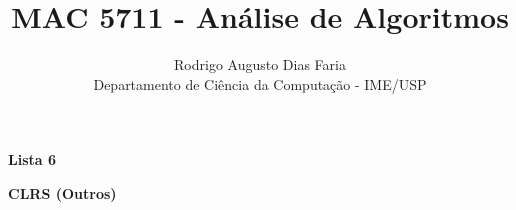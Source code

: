 \documentclass[12pt]{article}
\begin{document}
 
\title{MAC 5711 - Análise de Algoritmos}
\author{Rodrigo Augusto Dias Faria\\
Departamento de Ciência da Computação - IME/USP}
 
\maketitle

\begin{comment}
\begin{center} 
\textbf{\large{Lista 1}}
\end{center}




\clearpage
\begin{center} 
\textbf{\large{Lista 2}}
\end{center}



\clearpage
\begin{center} 
\textbf{\large{Lista 3}}
\end{center}





\clearpage

\begin{center} 
\textbf{\large{Lista 4}}
\end{center}






\clearpage

\begin{center} 
\textbf{\large{Lista 5}}
\end{center}
\end{comment}













\clearpage

\begin{center} 
\textbf{\large{Lista 6}}
\end{center}











\clearpage

\begin{center} 
\textbf{\large{CLRS (Outros)}}
\end{center}


\end{document}
